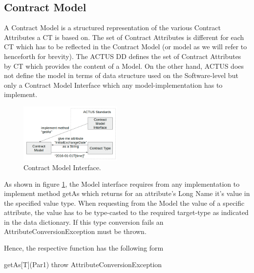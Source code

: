 \documentclass[9pt,oneside]{amsart}
\begin{document}
\begin{multicols}{2}



\section{Contract Model}\label{sec:model}

A Contract Model is a structured representation of the various Contract Attributes a CT is based on. The set of Contract Attributes is different for each CT which has to be reflected in the Contract Model (or model as we will refer to henceforth for brevity). The ACTUS DD defines the set of Contract Attributes by CT which provides the content of a Model. On the other hand, ACTUS does not define the model in terms of data structure used on the Software-level but only a Contract Model Interface which any model-implementation has to implement.



\begin{figure}[H]
	\centering
	\includegraphics[width=0.45\textwidth]{./media/model-interface.png}
	\caption{Contract Model Interface.}
	\label{fig:model-interface}
\end{figure}




As shown in figure \ref{fig:model-interface}, the Model interface requires from any implementation to implement method getAs  which returns for an attribute’s Long Name it’s value in the specified value type. When requesting from the Model the value of a specific attribute, the value has to be type-casted to the required target-type as indicated in the data dictionary. If this type conversion fails an AttributeConversionException must be thrown.

Hence, the respective function has the following form \par

getAs[T](Par1) throw AttributeConversionException \par


\end{multicols}
\end{document}
